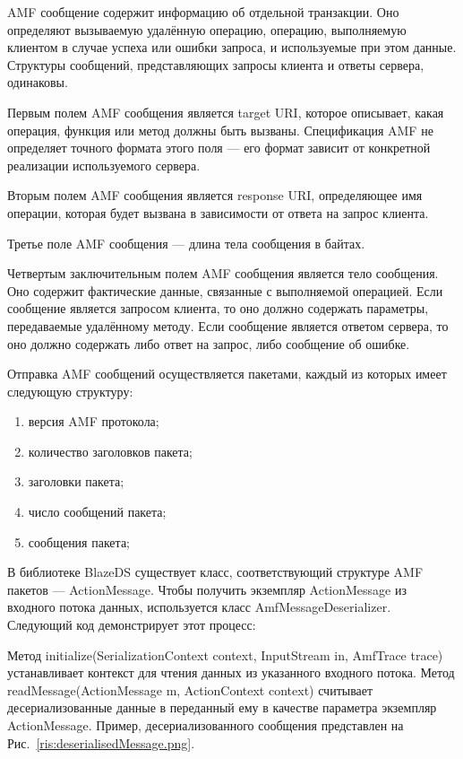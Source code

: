 AMF сообщение содержит информацию об отдельной транзакции. Оно определяют вызываемую удалённую операцию, 
операцию, выполняемую клиентом в случае успеха или ошибки запроса, и используемые при этом данные. Структуры сообщений,
представляющих запросы клиента и ответы сервера, одинаковы.
 
Первым полем AMF сообщения является target URI, которое описывает, какая операция, функция или 
метод должны быть вызваны. Спецификация AMF не определяет точного формата этого поля --- его формат зависит 
от конкретной реализации используемого сервера.

Вторым полем AMF сообщения является response URI, определяющее имя операции, которая будет вызвана в зависимости от 
ответа на запрос клиента.

Третье поле AMF сообщения --- длина тела сообщения в байтах.

Четвертым заключительным полем AMF сообщения является тело сообщения. Оно содержит фактические данные, связанные
с выполняемой операцией. Если сообщение является запросом клиента, то оно должно содержать параметры, передаваемые 
удалённому методу. Если сообщение является ответом сервера, то оно должно содержать либо ответ на запрос, либо 
сообщение об ошибке.

Отправка AMF сообщений осуществляется пакетами, каждый из которых имеет следующую структуру:

\begin{enumerate}
\item версия AMF протокола;
\item количество заголовков пакета;
\item заголовки пакета;
\item число сообщений пакета;
\item сообщения пакета;
\end{enumerate}

В библиотеке BlazeDS существует класс, соответствующий структуре AMF пакетов --- ActionMessage. Чтобы получить экземпляр
ActionMessage из входного потока данных, используется класс AmfMessageDeserializer. Следующий код демонстрирует 
этот процесс:


 
Метод initialize(SerializationContext context, InputStream in, AmfTrace trace) устанавливает контекст для чтения данных из 
указанного входного потока. Метод readMessage(ActionMessage m, ActionContext context) считывает десериализованные данные в 
переданный ему в качестве параметра экземпляр ActionMessage. Пример, десериализованного сообщения представлен на
Рис.~\ref{ris:deserialisedMessage.png}.

